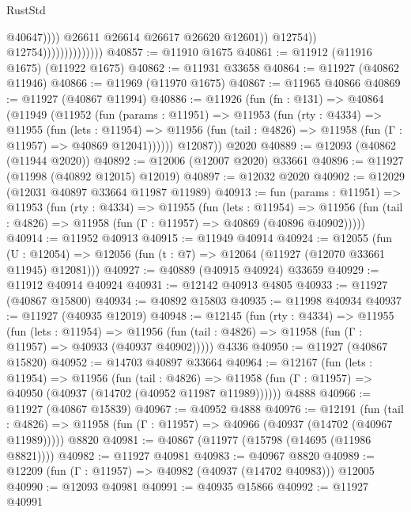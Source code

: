 \begin{lexlean}{RustStd}
\begin{coremodule}
                                                @40647))))
                                        @26611
                                        @26614
                                        @26617
                                        @26620
                                        @12601))
                                    @12754))
                                @12754))))))))))))))
@40857 := @11910 @1675
@40861 := @11912 (@11916 @1675) (@11922 @1675)
@40862 := @11931 @33658
@40864 := @11927 (@40862 @11946)
@40866 := @11969 (@11970 @1675)
@40867 := @11965 @40866
@40869 := @11927 (@40867 @11994)
@40886 := @11926
    (fun (fn : @131) =>
    @40864
      (@11949
        (@11952
          (fun (params : @11951) =>
          @11953
            (fun (rty : @4334) =>
            @11955
              (fun (lets : @11954) =>
              @11956 (fun (tail : @4826) => @11958 (fun (Γ : @11957) => @40869 @12041))))))
        @12087))
    @2020
@40889 := @12093 (@40862 (@11944 @2020))
@40892 := @12006 (@12007 @2020) @33661
@40896 := @11927 (@11998 (@40892 @12015) @12019)
@40897 := @12032 @2020
@40902 := @12029 (@12031 @40897 @33664 @11987 @11989)
@40913 := fun (params : @11951) =>
  @11953
    (fun (rty : @4334) =>
    @11955
      (fun (lets : @11954) =>
      @11956 (fun (tail : @4826) => @11958 (fun (Γ : @11957) => @40869 (@40896 @40902)))))
@40914 := @11952 @40913
@40915 := @11949 @40914
@40924 := @12055
    (fun (U : @12054) => @12056 (fun (t : @7) => @12064 (@11927 (@12070 @33661 @11945) @12081)))
@40927 := @40889 (@40915 @40924) @33659
@40929 := @11912 @40914 @40924
@40931 := @12142 @40913 @4805
@40933 := @11927 (@40867 @15800)
@40934 := @40892 @15803
@40935 := @11998 @40934
@40937 := @11927 (@40935 @12019)
@40948 := @12145
    (fun (rty : @4334) =>
    @11955
      (fun (lets : @11954) =>
      @11956 (fun (tail : @4826) => @11958 (fun (Γ : @11957) => @40933 (@40937 @40902)))))
    @4336
@40950 := @11927 (@40867 @15820)
@40952 := @14703 @40897 @33664
@40964 := @12167
    (fun (lets : @11954) =>
    @11956
      (fun (tail : @4826) =>
      @11958 (fun (Γ : @11957) => @40950 (@40937 (@14702 (@40952 @11987 @11989))))))
    @4888
@40966 := @11927 (@40867 @15839)
@40967 := @40952 @4888
@40976 := @12191
    (fun (tail : @4826) => @11958 (fun (Γ : @11957) => @40966 (@40937 (@14702 (@40967 @11989)))))
    @8820
@40981 := @40867 (@11977 (@15798 (@14695 (@11986 @8821))))
@40982 := @11927 @40981
@40983 := @40967 @8820
@40989 := @12209 (fun (Γ : @11957) => @40982 (@40937 (@14702 @40983))) @12005
@40990 := @12093 @40981
@40991 := @40935 @15866
@40992 := @11927 @40991

\end{coremodule}
\end{lexlean}
